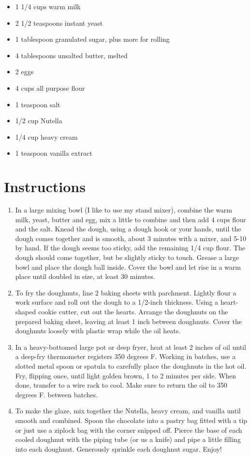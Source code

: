 \documentclass[
  letterpaper,
  DIV=11,
  numbers=noendperiod,
  titlepage=false]{scrreprt}
\providecommand{\tightlist}{%
  \setlength{\itemsep}{0pt}\setlength{\parskip}{0pt}}\usepackage{longtable,booktabs,array}
\begin{document}
\begin{itemize}
\tightlist
\item
  1 1/4 cups warm milk
\item
  2 1/2 teaspoons instant yeast
\item
  1 tablespoon granulated sugar, plus more for rolling
\item
  4 tablespoons unsalted butter, melted
\item
  2 eggs
\item
  4 cups all purpose flour
\item
  1 teaspoon salt
\item
  1/2 cup Nutella
\item
  1/4 cup heavy cream
\item
  1 teaspoon vanilla extract
\end{itemize}

\section{Instructions}\label{instructions-25}

\begin{enumerate}
\def\labelenumi{\arabic{enumi}.}
\tightlist
\item
  In a large mixing bowl (I like to use my stand mixer), combine the
  warm milk, yeast, butter and egg, mix a little to combine and then add
  4 cups flour and the salt. Knead the dough, using a dough hook or your
  hands, until the dough comes together and is smooth, about 3 minutes
  with a mixer, and 5-10 by hand. If the dough seems too sticky, add the
  remaining 1/4 cup flour. The dough should come together, but be
  slightly sticky to touch. Grease a large bowl and place the dough ball
  inside. Cover the bowl and let rise in a warm place until doubled in
  size, at least 30 minutes.
\item
  To fry the doughnuts, line 2 baking sheets with parchment. Lightly
  flour a work surface and roll out the dough to a 1/2-inch thickness.
  Using a heart-shaped cookie cutter, cut out the hearts. Arrange the
  doughnuts on the prepared baking sheet, leaving at least 1 inch
  between doughnuts. Cover the doughnuts loosely with plastic wrap while
  the oil heats.
\item
  In a heavy-bottomed large pot or deep fryer, heat at least 2 inches of
  oil until a deep-fry thermometer registers 350 degrees F. Working in
  batches, use a slotted metal spoon or spatula to carefully place the
  doughnuts in the hot oil. Fry, flipping once, until light golden
  brown, 1 to 2 minutes per side. When done, transfer to a wire rack to
  cool. Make sure to return the oil to 350 degrees F. between batches.
\item
  To make the glaze, mix together the Nutella, heavy cream, and vanilla
  until smooth and combined. Spoon the chocolate into a pastry bag
  fitted with a tip or just use a ziplock bag with the corner snipped
  off. Pierce the base of each cooled doughnut with the piping tube (or
  us a knife) and pipe a little filling into each doughnut. Generously
  sprinkle each doughnut sugar. Enjoy!
\end{enumerate}
\end{document}
